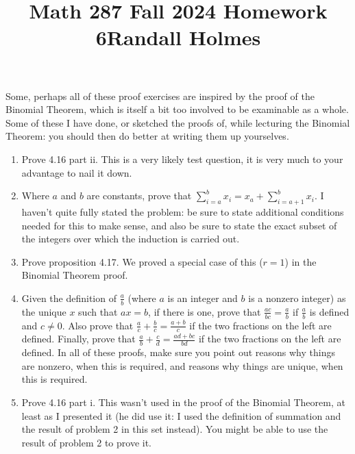 \documentclass[12pt]{article}
\title{Math 287 Fall 2024 Homework 6}
\title{Randall Holmes}
\begin{document}
\maketitle

Some, perhaps all of these proof exercises are inspired by the proof of the Binomial Theorem, which is itself a bit too involved to be examinable as a whole.  Some of these I have done, or sketched the proofs of, while lecturing the Binomial Theorem:  you should then do better at writing them up yourselves.

\begin{enumerate}

\item  Prove 4.16 part ii.  This is a very likely test question, it is very much to your advantage to nail it down.

\item  Where $a$ and $b$ are constants, prove that $\sum_{i=a}^b x_i = x_a + \sum_{i=a+1}^b x_i$.  I haven't quite fully stated the problem:  be sure to state additional conditions needed for this to make sense, and also be sure to state the exact subset of the integers over which the induction is carried out.

\item  Prove proposition 4.17.  We proved a special case of this ($r=1$) in the Binomial Theorem proof.

\item  Given the definition of $\frac ab$ (where $a$ is an integer and $b$ is a nonzero integer) as the unique $x$ such 
that $ax=b$, if there is one, prove that $\frac{ac}{bc} = \frac ab$ if $\frac ab$ is defined and $c \neq 0$.  Also prove
that $\frac ac + \frac bc = \frac {a+b}c$ if the two fractions on the left are defined.  Finally, prove
that $\frac ab + \frac cd = \frac {ad+bc}{bd}$ if the two fractions on the left are defined.  In all of these proofs, make sure you point out reasons why things are nonzero, when this is required, and reasons why things are unique, when this is required.

\item   Prove 4.16 part i.  This wasn't used in the proof of the Binomial Theorem, at least as I presented it (he did use it:  I used the definition of summation and the result of problem 2 in this set instead).  You might be able to use the result of problem 2 to prove it.

\end{enumerate}
\end{document}
